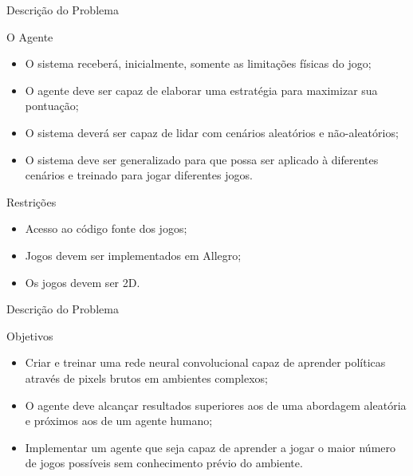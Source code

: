 \documentclass[aspectratio=169]{beamer}
\begin{document}
\begin{frame}{Descrição do Problema}
	\begin{block}{\large{{O Agente}}}
		\begin{itemize}
			\item O sistema receberá, inicialmente, somente as limitações físicas do jogo;

			\item O agente deve ser capaz de elaborar uma estratégia para maximizar sua pontuação;

			\item O sistema deverá ser capaz de lidar com cenários aleatórios e não-aleatórios;

			\item O sistema deve ser generalizado para que possa ser aplicado à diferentes cenários e treinado para jogar diferentes jogos.
		\end{itemize}
	\end{block}
	\pause
	\begin{block}{\large{{Restrições}}}
		\begin{itemize}
			\item Acesso ao código fonte dos jogos;
			\item Jogos devem ser implementados em Allegro;
			\item Os jogos devem ser 2D.
		\end{itemize}
	\end{block}

\end{frame}

\begin{frame}{Descrição do Problema}
	
	\begin{block}{\large{{Objetivos}}}
		\begin{itemize}
			\item Criar e treinar uma rede neural convolucional capaz de aprender políticas através de pixels brutos em ambientes complexos;

			\item O agente deve alcançar resultados superiores aos de uma abordagem aleatória e próximos aos de um agente humano;

			\item Implementar um agente que seja capaz de aprender a jogar o maior número de jogos possíveis sem conhecimento prévio do ambiente.
		\end{itemize}
	\end{block}
\end{frame}
\end{document}
